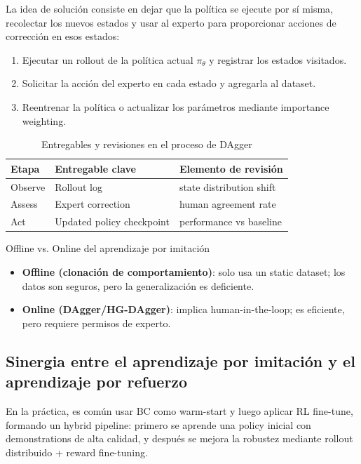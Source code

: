\documentclass[a4paper]{article}
\begin{document}
La idea de solución consiste en dejar que la política se ejecute por sí misma, recolectar los nuevos estados y usar al experto para proporcionar acciones de corrección en esos estados:
\begin{enumerate}
    \item Ejecutar un rollout de la política actual $\pi_\theta$ y registrar los estados visitados.
    \item Solicitar la acción del experto en cada estado y agregarla al dataset.
    \item Reentrenar la política o actualizar los parámetros mediante importance weighting.
\end{enumerate}

\begin{table}[H]
\centering
\begin{tabular}{p{} p{} p{}}
\toprule
Etapa & Entregable clave & Elemento de revisión \\
\midrule
Observe & Rollout log & state distribution shift \\
Assess & Expert correction & human agreement rate \\
Act & Updated policy checkpoint & performance vs baseline \\
\bottomrule
\end{tabular}
\caption{Entregables y revisiones en el proceso de DAgger}
\end{table}

\begin{knowledgebox}{Offline vs. Online del aprendizaje por imitación}
\begin{itemize}
    \item \textbf{Offline (clonación de comportamiento)}: solo usa un static dataset; los datos son seguros, pero la generalización es deficiente.
    \item \textbf{Online (DAgger/HG-DAgger)}: implica human-in-the-loop; es eficiente, pero requiere permisos de experto.
\end{itemize}
\end{knowledgebox}

\subsection{Sinergia entre el aprendizaje por imitación y el aprendizaje por refuerzo}

En la práctica, es común usar BC como warm-start y luego aplicar RL fine-tune, formando un hybrid pipeline: primero se aprende una policy inicial con demonstrations de alta calidad, y después se mejora la robustez mediante rollout distribuido + reward fine-tuning.
\end{document}
